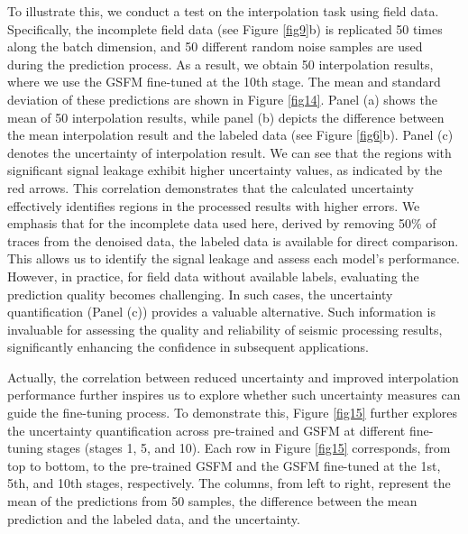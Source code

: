 To illustrate this, we conduct a test on the interpolation task using field data. Specifically, the incomplete field data (see Figure \ref{fig9}b) is replicated 50 times along the batch dimension, and 50 different random noise samples are used during the prediction process. As a result, we obtain 50 interpolation results, where we use the GSFM fine-tuned at the 10th stage. The mean and standard deviation of these predictions are shown in Figure \ref{fig14}. Panel (a) shows the mean of 50 interpolation results, while panel (b) depicts the difference between the mean interpolation result and the labeled data (see Figure \ref{fig6}b). Panel (c) denotes the uncertainty of interpolation result. We can see that the regions with significant signal leakage exhibit higher uncertainty values, as indicated by the red arrows. This correlation demonstrates that the calculated uncertainty effectively identifies regions in the processed results with higher errors. We emphasis that for the incomplete data used here, derived by removing 50\% of traces from the denoised data, the labeled data is available for direct comparison. This allows us to identify the signal leakage and assess each model’s performance. However, in practice, for field data without available labels, evaluating the prediction quality becomes challenging. In such cases, the uncertainty quantification (Panel (c)) provides a valuable alternative. Such information is invaluable for assessing the quality and reliability of seismic processing results, significantly enhancing the confidence in subsequent applications. 

Actually, the correlation between reduced uncertainty and improved interpolation performance further inspires us to explore whether such uncertainty measures can guide the fine-tuning process. To demonstrate this, Figure \ref{fig15} further explores the uncertainty quantification across pre-trained and GSFM at different fine-tuning stages (stages 1, 5, and 10). Each row in Figure \ref{fig15} corresponds, from top to bottom, to the pre-trained GSFM and the GSFM fine-tuned at the 1st, 5th, and 10th stages, respectively. The columns, from left to right, represent the mean of the predictions from 50 samples, the difference between the mean prediction and the labeled data, and the uncertainty. 

